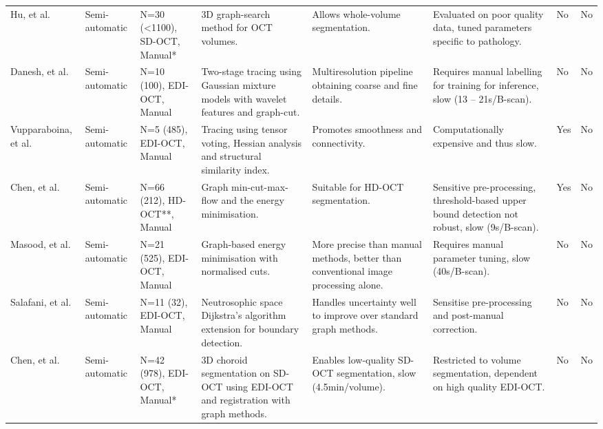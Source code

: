 {\begin{longtable}{p{1.5cm}p{1.5cm}p{2cm}p{5cm}p{3cm}p{3cm}P{1cm}p{1cm}}
Hu, et al. \cite{hu2013semiautomated} & Semi-automatic & N=30 (<1100), SD-OCT, Manual* & 3D graph-search method for OCT volumes. & Allows whole-volume segmentation. & Evaluated on poor quality data, tuned parameters specific to pathology. & No & No \\

Danesh, et al. \cite{danesh2014segmentation} & Semi-automatic & N=10 (100), EDI-OCT, Manual & Two-stage tracing using Gaussian mixture models with wavelet features and graph-cut. & Multiresolution pipeline obtaining coarse and fine details. & Requires manual labelling for training for inference, slow (13 -- 21s/B-scan). & No & No \\

Vupparaboina, et al. \cite{vupparaboina2015automated} & Semi-automatic & N=5 (485), EDI-OCT, Manual & Tracing using tensor voting, Hessian analysis and structural similarity index. & Promotes smoothness and connectivity. & Computationally expensive and thus slow. & Yes & No \\

Chen, et al. \cite{chen2015automated} & Semi-automatic & N=66 (212), HD-OCT**, Manual & Graph min-cut-max-flow and the energy minimisation. & Suitable for HD-OCT segmentation. & Sensitive pre-processing, threshold-based upper bound detection not robust, slow (9s/B-scan). & Yes & No \\

Masood, et al. \cite{masood2018automatic} & Semi-automatic & N=21 (525), EDI-OCT, Manual & Graph-based energy minimisation with normalised cuts. & More precise than manual methods, better than conventional image processing alone. & Requires manual parameter tuning, slow (40s/B-scan). & No & No \\

Salafani, et al. \cite{salafian2018automatic} & Semi-automatic & N=11 (32), EDI-OCT, Manual & Neutrosophic space Dijkstra's algorithm \cite{dijkstra2022note} extension for boundary detection. & Handles uncertainty well to improve over standard graph methods. & Sensitise pre-processing and post-manual correction. & No & No \\

Chen, et al. \cite{chen2018automated} & Semi-automatic & N=42 (978), EDI-OCT, Manual* & 3D choroid segmentation on SD-OCT using EDI-OCT and registration with graph methods. & Enables low-quality SD-OCT segmentation, slow (4.5min/volume). & Restricted to volume segmentation, dependent on high quality EDI-OCT. & No & No \\


\end{longtable}}
